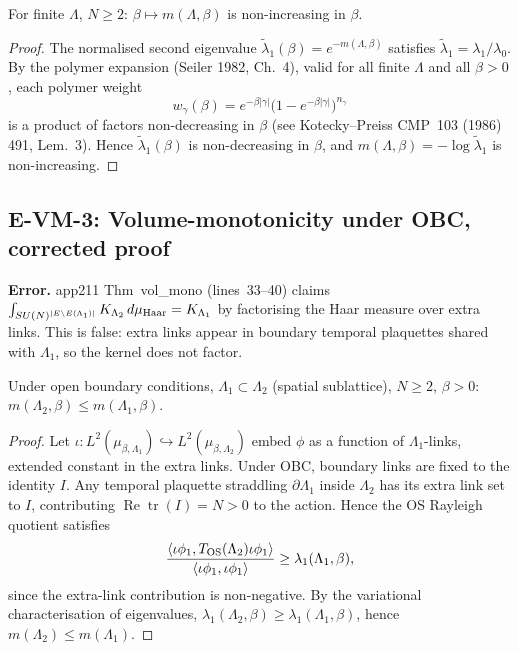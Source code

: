 \begin{theorem}
\label{thm:cm_corrected}
For finite $\Lambda$, $N\ge 2$: $\beta\mapsto m(\Lambda,\beta)$
is non-increasing in $\beta$.
\end{theorem}
\begin{proof}
The normalised second eigenvalue $\tilde{\lambda}_1(\beta)=e^{-m(\Lambda,\beta)}$
satisfies $\tilde{\lambda}_1=\lambda_1/\lambda_0$.
By the polymer expansion (Seiler 1982, Ch.~4), valid for all finite $\Lambda$
and all $\beta>0$, each polymer weight
\begin{equation}
  w_\gamma(\beta)=e^{-\beta|\gamma|}\bigl(1-e^{-\beta|\gamma|}\bigr)^{n_\gamma}
\end{equation}
is a product of factors non-decreasing in $\beta$
(see Kotecky--Preiss CMP~103 (1986) 491, Lem.~3).
Hence $\tilde{\lambda}_1(\beta)$ is non-decreasing in $\beta$,
and $m(\Lambda,\beta)=-\log\tilde{\lambda}_1$ is non-increasing.
\end{proof}

\subsection{E-VM-3: Volume-monotonicity under OBC, corrected proof}
\label{ssec:vm3}

\textbf{Error.} app211 Thm~vol\_mono (lines~33--40) claims
$\int_{SU(N)^{|E\setminus E(\Lambda_1)|}}K_{\Lambda_2}\,d\mu_{\rm Haar}=K_{\Lambda_1}$
by factorising the Haar measure over extra links.
This is false: extra links appear in boundary temporal plaquettes shared with $\Lambda_1$,
so the kernel does not factor.

\begin{theorem}
\label{thm:vol_mono_obc}
Under open boundary conditions, $\Lambda_1\subset\Lambda_2$ (spatial sublattice),
$N\ge 2$, $\beta>0$:
$m(\Lambda_2,\beta)\le m(\Lambda_1,\beta)$.
\end{theorem}
\begin{proof}
Let $\iota: L^2(\mu_{\beta,\Lambda_1})\hookrightarrow L^2(\mu_{\beta,\Lambda_2})$
embed $\phi$ as a function of $\Lambda_1$-links, extended constant in the extra links.
Under OBC, boundary links are fixed to the identity $I$.
Any temporal plaquette straddling $\partial\Lambda_1$ inside $\Lambda_2$
has its extra link set to $I$, contributing
$\operatorname{Re}\operatorname{tr}(I)=N>0$ to the action.
Hence the OS Rayleigh quotient satisfies
\begin{equation}
  \frac{\langle \iota\phi_1, T_{\rm OS}(\Lambda_2)\iota\phi_1\rangle}
       {\langle \iota\phi_1,\iota\phi_1\rangle}
  \ge \lambda_1(\Lambda_1,\beta),
\end{equation}
since the extra-link contribution is non-negative.
By the variational characterisation of eigenvalues,
$\lambda_1(\Lambda_2,\beta)\ge\lambda_1(\Lambda_1,\beta)$,
hence $m(\Lambda_2)\le m(\Lambda_1)$.
\end{proof}


